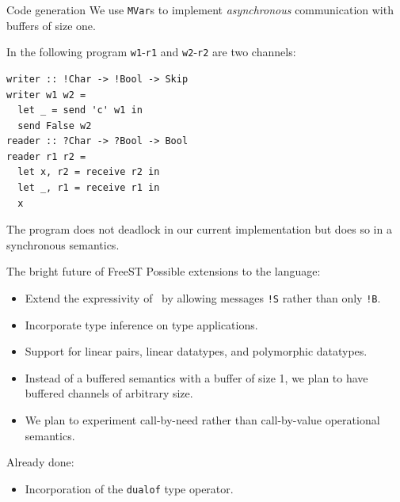 \documentclass[10pt]{beamer}
\begin{document}


\begin{frame}[fragile]{Code generation}
We use
\lstinline|MVar|s to implement \emph{asynchronous} communication with
buffers of size one. \pause

In the following program
\lstinline|w1|-\lstinline|r1| and \lstinline|w2|-\lstinline|r2| are
two channels:
%
\begin{lstlisting}
writer :: !Char -> !Bool -> Skip
writer w1 w2 =
  let _ = send 'c' w1 in
  send False w2
reader :: ?Char -> ?Bool -> Bool
reader r1 r2 =
  let x, r2 = receive r2 in
  let _, r1 = receive r1 in
  x
\end{lstlisting}
%
The program does not deadlock in our current implementation but does
so in a synchronous semantics.	
\end{frame}

\begin{frame}[fragile]{The bright future of FreeST}
Possible extensions to the language:
\begin{itemize}
	\item Extend the expressivity of \freest\ by allowing messages \lstinline|!S| rather than only \lstinline|!B|.
	\item Incorporate type inference on type applications.
	\item Support for linear pairs, linear datatypes, and polymorphic datatypes.
	\item Instead of a buffered semantics with a buffer of size 1, we plan to have buffered channels of arbitrary size.
	\item We plan to experiment call-by-need rather than call-by-value operational semantics.
\end{itemize}

Already done:
\begin{itemize}
	\item Incorporation of the \lstinline|dualof| type operator.
\end{itemize}
	
\end{frame}

\end{document}
